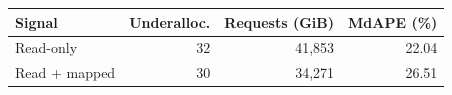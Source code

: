 \begin{tabular}{@{}lrrr@{}}
\toprule
Signal & Underalloc. & Requests (GiB) & MdAPE (\%)\\
\midrule
Read-only & 32 & 41,853 & 22.04 \\
Read + mapped & 30 & 34,271 & 26.51 \\
\bottomrule
\end{tabular}
